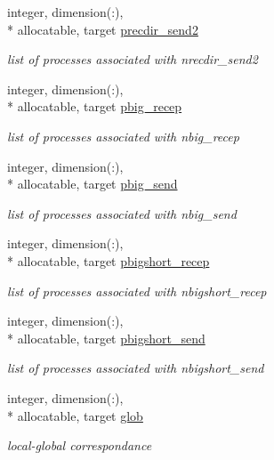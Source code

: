 \begin{DoxyCompactItemize}
integer, dimension(\-:), \\*
allocatable, target \hyperlink{classdomdec_a44484ba004f950136be30521a36c5946}{precdir\-\_\-send2}
\begin{DoxyCompactList}\small\item\em list of processes associated with nrecdir\-\_\-send2 \end{DoxyCompactList}\item 
integer, dimension(\-:), \\*
allocatable, target \hyperlink{classdomdec_a2d8dc7137683aeffdb639b128de9a68a}{pbig\-\_\-recep}
\begin{DoxyCompactList}\small\item\em list of processes associated with nbig\-\_\-recep \end{DoxyCompactList}\item 
integer, dimension(\-:), \\*
allocatable, target \hyperlink{classdomdec_acb406c89cb7b4240f2e81ba5ecbed7e2}{pbig\-\_\-send}
\begin{DoxyCompactList}\small\item\em list of processes associated with nbig\-\_\-send \end{DoxyCompactList}\item 
integer, dimension(\-:), \\*
allocatable, target \hyperlink{classdomdec_a588c3664b18e8576817604627f1b8aef}{pbigshort\-\_\-recep}
\begin{DoxyCompactList}\small\item\em list of processes associated with nbigshort\-\_\-recep \end{DoxyCompactList}\item 
integer, dimension(\-:), \\*
allocatable, target \hyperlink{classdomdec_a3de9da3bc58ffb96711e59d730a60f28}{pbigshort\-\_\-send}
\begin{DoxyCompactList}\small\item\em list of processes associated with nbigshort\-\_\-send \end{DoxyCompactList}\item 
integer, dimension(\-:), \\*
allocatable, target \hyperlink{classdomdec_a911e9f8522f16f4a96ca6b9ced522ea2}{glob}
\begin{DoxyCompactList}\small\item\em local-\/global correspondance \end{DoxyCompactList}\item 

\end{DoxyCompactItemize}

